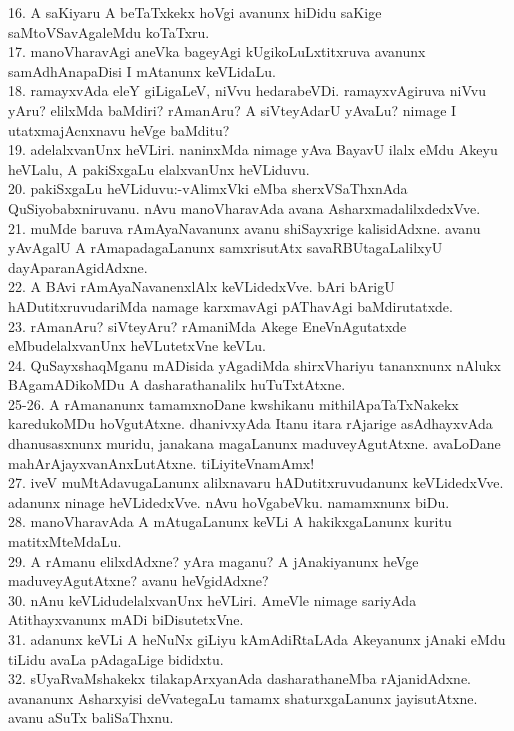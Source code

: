 \documentclass{article}
\begin{document}
16. A saKiyaru A beTaTxkekx hoVgi avanunx hiDidu saKige saMtoVSavAgaleMdu koTaTxru.\\
17. manoVharavAgi aneVka bageyAgi kUgikoLuLxtitxruva avanunx samAdhAnapaDisi I mAtanunx keVLidaLu.\\
18. ramayxvAda eleY giLigaLeV, niVvu hedarabeVDi.  ramayxvAgiruva niVvu yAru? elilxMda baMdiri? rAmanAru? A siVteyAdarU yAvaLu? nimage I utatxmajAcnxnavu heVge baMditu?\\
19. adelalxvanUnx heVLiri. naninxMda nimage yAva BayavU ilalx eMdu Akeyu heVLalu, A pakiSxgaLu elalxvanUnx heVLiduvu.\\
20. pakiSxgaLu heVLiduvu:-vAlimxVki eMba sherxVSaThxnAda QuSiyobabxniruvanu. nAvu manoVharavAda avana AsharxmadalilxdedxVve.\\
21. muMde baruva rAmAyaNavanunx avanu shiSayxrige kalisidAdxne. avanu yAvAgalU A rAmapadagaLanunx samxrisutAtx savaRBUtagaLalilxyU dayAparanAgidAdxne.\\
22. A BAvi rAmAyaNavanenxlAlx keVLidedxVve. bAri bArigU hADutitxruvudariMda namage karxmavAgi pAThavAgi baMdirutatxde.\\
23. rAmanAru? siVteyAru? rAmaniMda Akege EneVnAgutatxde eMbudelalxvanUnx heVLutetxVne keVLu.\\
24. QuSayxshaqMganu mADisida yAgadiMda shirxVhariyu tananxnunx nAlukx BAgamADikoMDu A dasharathanalilx huTuTxtAtxne.\\
25-26. A rAmananunx tamamxnoDane kwshikanu mithilApaTaTxNakekx karedukoMDu hoVgutAtxne. dhanivxyAda Itanu itara rAjarige asAdhayxvAda dhanusasxnunx muridu, janakana magaLanunx maduveyAgutAtxne. avaLoDane mahArAjayxvanAnxLutAtxne. tiLiyiteVnamAmx!\\
27. iveV muMtAdavugaLanunx alilxnavaru hADutitxruvudanunx keVLidedxVve. adanunx ninage heVLidedxVve. nAvu hoVgabeVku. namamxnunx biDu.\\
28. manoVharavAda A mAtugaLanunx keVLi A hakikxgaLanunx kuritu matitxMteMdaLu.\\
29. A rAmanu elilxdAdxne? yAra maganu? A jAnakiyanunx heVge maduveyAgutAtxne? avanu heVgidAdxne?\\
30. nAnu keVLidudelalxvanUnx heVLiri. AmeVle nimage sariyAda Atithayxvanunx mADi biDisutetxVne.\\
31. adanunx keVLi A heNuNx giLiyu kAmAdiRtaLAda Akeyanunx jAnaki eMdu tiLidu avaLa pAdagaLige bididxtu.\\
32. sUyaRvaMshakekx tilakapArxyanAda dasharathaneMba rAjanidAdxne. avananunx Asharxyisi deVvategaLu tamamx shaturxgaLanunx jayisutAtxne. avanu aSuTx baliSaThxnu.\\
\end{document}
